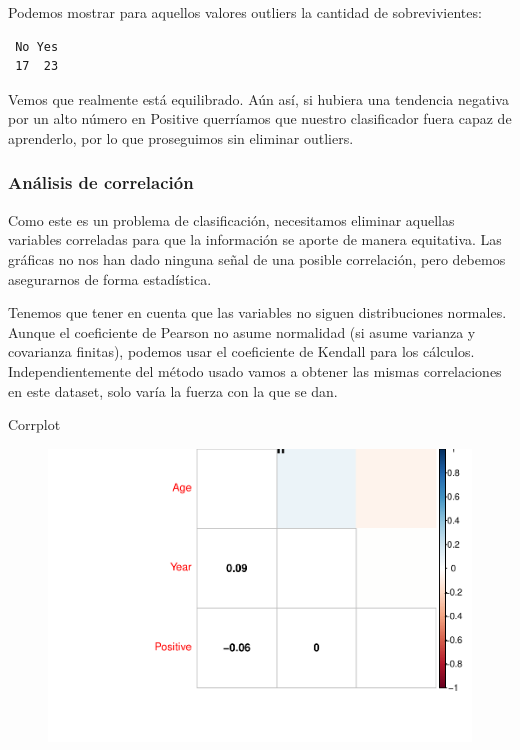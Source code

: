 Podemos mostrar para aquellos valores outliers la cantidad de sobrevivientes:

\begin{verbatim}
 No Yes 
 17  23 
\end{verbatim}

Vemos que realmente está equilibrado. Aún así, si hubiera una tendencia negativa por un alto número en Positive querríamos que nuestro clasificador fuera capaz de aprenderlo, por lo que proseguimos sin eliminar outliers.


\subsubsection{Análisis de correlación}

Como este es un problema de clasificación, necesitamos eliminar aquellas variables correladas para que la información se aporte de manera equitativa. Las gráficas no nos han dado ninguna señal de una posible correlación, pero debemos asegurarnos de forma estadística.

Tenemos que tener en cuenta que las variables no siguen distribuciones normales. Aunque el coeficiente de Pearson no asume normalidad (si asume varianza y covarianza finitas), podemos usar el coeficiente de Kendall para los cálculos. Independientemente del método usado vamos a obtener las mismas correlaciones en este dataset, solo varía la fuerza con la que se dan.

Corrplot
\begin{figure}[H]\includegraphics[width=.9\linewidth]{img/EDA2_files/figure-latex/unnamed-chunk-27-1} \end{figure}

